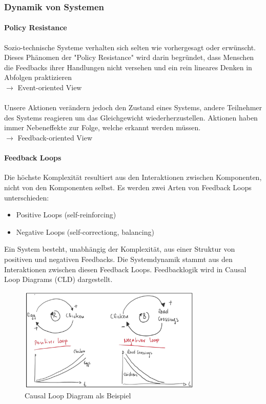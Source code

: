 \documentclass[a4paper]{article}
\begin{document}
\newpage

		\subsubsection{Dynamik von Systemen}
		
			\paragraph{Policy Resistance}
			
			Sozio-technische Systeme verhalten sich selten wie vorhergesagt oder erwünscht.
			Dieses Phänomen der "Policy Resistance" wird darin begründet, dass Menschen die Feedbacks ihrer Handlungen nicht versehen und ein rein lineares Denken in Abfolgen praktizieren\\
			$\rightarrow$ Event-oriented View\\
			\\
			Unsere Aktionen verändern jedoch den Zustand eines Systems, andere Teilnehmer des Systems reagieren um das Gleichgewicht wiederherzustellen.
			Aktionen haben immer Nebeneffekte zur Folge, welche erkannt werden müssen.\\
			$\rightarrow$ Feedback-oriented View
			
			\paragraph{Feedback Loops}
			
			Die höchste Komplexität resultiert aus den Interaktionen zwischen Komponenten, nicht von den Komponenten selbst.
			Es werden zwei Arten von Feedback Loops unterschieden:
			\begin{itemize}
				\item Positive Loops (self-reinforcing)
				\item Negative Loops (self-correctiong, balancing)
			\end{itemize}		
			Ein System besteht, unabhängig der Komplexität, aus einer Struktur von positiven und negativen Feedbacks.
			Die Systemdynamik stammt aus den Interaktionen zwischen diesen Feedback Loops.
			Feedbacklogik wird in Causal Loop Diagrams (CLD) dargestellt.
	
			\begin{figure}[!htb]
				\centering
				\includegraphics[height=5cm]{img/pm/feedback_loop.jpeg}
				\caption{Causal Loop Diagram als Beispiel}
				\label{fig:pm_feedback_loops}
			\end{figure}
		
\end{document}
